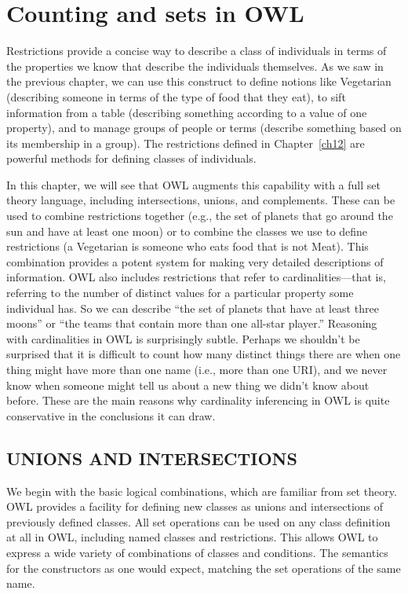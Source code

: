 \chapter{Counting and sets in OWL}
\label{ch13}

Restrictions provide a concise way to describe a class of individuals in
terms of the properties we know that describe the individuals
themselves. As we saw in the previous chapter, we can use this construct
to define notions like Vegetarian (describing someone in terms of the
type of food that they eat), to sift information from a table
(describing something according to a value of one property), and to
manage groups of people or terms (describe something based on its
membership in a group). The restrictions defined in Chapter~\ref{ch12} are
powerful methods for defining classes of individuals.

In this chapter, we will see that OWL augments this capability with a full
set theory language, including intersections, unions, and complements.
These can be used to combine restrictions together (e.g., the set of
planets that go around the sun and have at least one moon) or to combine
the classes we use to define restrictions (a Vegetarian is someone who
eats food that is not Meat). This combination provides a potent system
for making very detailed descriptions of information.
OWL also includes restrictions that refer to cardinalities---that is,
referring to the number of distinct values for a particular property
some individual has. So we can describe ``the set of planets that have
at least three moons'' or ``the teams that contain more than one
all-star player.'' Reasoning with cardinalities in OWL is surprisingly
subtle. Perhaps we shouldn't be surprised that it is difficult to count
how many distinct things there are when one thing might have more than
one name (i.e., more than one URI), and we never know when someone might
tell us about a new thing we didn't know about before. These are the
main reasons why cardinality inferencing in OWL is quite conservative in
the conclusions it can draw.

\section{UNIONS AND INTERSECTIONS}
\label{unions}

We begin with the basic logical combinations, which are familiar from
set theory. OWL provides a facility for defining new classes as unions
and intersections of previously defined classes. All set operations can
be used on any class definition at all in OWL, including named classes
and restrictions. This allows OWL to express a wide variety of
combinations of classes and conditions. The semantics for the
constructors as one would expect, matching the set operations of the
same name.

